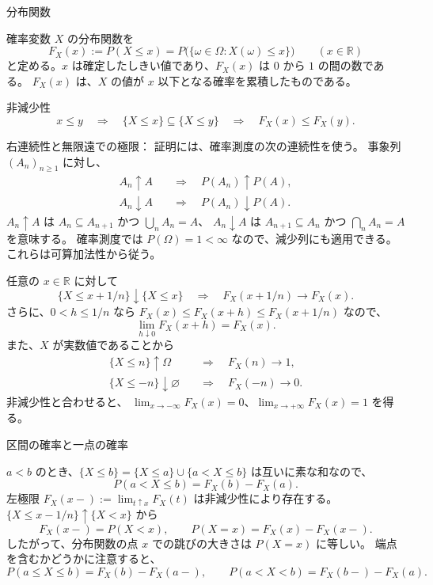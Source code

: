 \documentclass[a4paper,10pt,pdflatex,ja=standard,jafont=ipaex-type1,
  magstyle=real,scale=1]{bxjsarticle}
\newcommand{\topic}[1]{\par\vspace{5pt}
  {\large\sffamily\mdseries\color{accent}#1}\par\vspace{2pt}}
\newcommand{\examplelabel}[1]{{\sffamily\mdseries\color{ink}#1}}
\newcommand{\R}{\mathbb R}
\begin{document}
\newpage
\topic{分布関数}
確率変数 $X$ の分布関数を
$$
  F_X(x):=P(X\le x)
  =P\bigl(\{\omega\in\Omega:X(\omega)\le x\}\bigr)
  \qquad(x\in\R)
$$
と定める。$x$ は確定したしきい値であり、$F_X(x)$ は $0$ から $1$ の間の数である。
$F_X(x)$ は、$X$ の値が $x$ 以下となる確率を累積したものである。

\examplelabel{非減少性}
$$
  x\le y\quad\Longrightarrow\quad
  \{X\le x\}\subseteq\{X\le y\}
  \quad\Longrightarrow\quad F_X(x)\le F_X(y).
$$

\examplelabel{右連続性と無限遠での極限：}
証明には、確率測度の次の連続性を使う。
事象列 $(A_n)_{n\ge1}$ に対し、
$$
  \begin{aligned}
    A_n\uparrow A&\quad\Longrightarrow\quad P(A_n)\uparrow P(A),\\
    A_n\downarrow A&\quad\Longrightarrow\quad P(A_n)\downarrow P(A).
  \end{aligned}
$$
$A_n\uparrow A$ は $A_n\subseteq A_{n+1}$ かつ $\bigcup_n A_n=A$、
$A_n\downarrow A$ は $A_{n+1}\subseteq A_n$ かつ $\bigcap_n A_n=A$ を意味する。
確率測度では $P(\Omega)=1<\infty$ なので、減少列にも適用できる。
これらは可算加法性から従う。

任意の $x\in\R$ に対して
$$
  \{X\le x+1/n\}\downarrow\{X\le x\}
  \quad\Longrightarrow\quad
  F_X(x+1/n)\longrightarrow F_X(x).
$$
さらに、$0<h\le1/n$ なら $F_X(x)\le F_X(x+h)\le F_X(x+1/n)$ なので、
$$
  \lim_{h\downarrow0}F_X(x+h)=F_X(x).
$$
また、$X$ が実数値であることから
$$
  \begin{aligned}
    \{X\le n\}\uparrow\Omega
      &\quad\Longrightarrow\quad F_X(n)\longrightarrow1,\\
    \{X\le-n\}\downarrow\varnothing
      &\quad\Longrightarrow\quad F_X(-n)\longrightarrow0.
  \end{aligned}
$$
非減少性と合わせると、
$\lim_{x\to-\infty}F_X(x)=0$、$\lim_{x\to+\infty}F_X(x)=1$ を得る。

\topic{区間の確率と一点の確率}
$a<b$ のとき、$\{X\le b\}=\{X\le a\}\cup\{a<X\le b\}$ は互いに素な和なので、
$$
  P(a<X\le b)=F_X(b)-F_X(a).
$$
左極限 $F_X(x-):=\lim_{t\uparrow x}F_X(t)$ は非減少性により存在する。
$\{X\le x-1/n\}\uparrow\{X<x\}$ から
$$
  F_X(x-)=P(X<x),\qquad P(X=x)=F_X(x)-F_X(x-).
$$
したがって、分布関数の点 $x$ での跳びの大きさは $P(X=x)$ に等しい。
端点を含むかどうかに注意すると、
$$
  P(a\le X\le b)=F_X(b)-F_X(a-),\qquad
  P(a<X<b)=F_X(b-)-F_X(a).
$$
\end{document}
